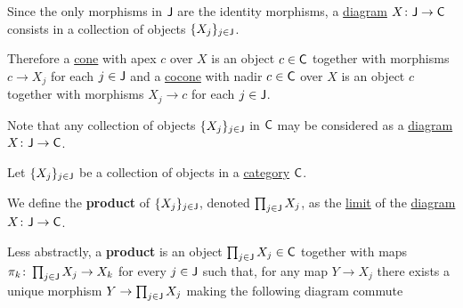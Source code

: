 \documentclass[../../main]{subfiles}
\begin{document}
Since the only morphisms in \(\mathsf{J}\) are the identity morphisms, a \hyperref[def:diagram]{diagram} \(X\colon \mathsf{J} \to \mathsf{C}\) consists in a collection of objects \(\{X_{j}\}_{j \in \mathsf{J}}\).

Therefore a \hyperref[def:cone]{cone} with apex \(c\) over \(X\) is an object \(c \in \mathsf{C}\) together with morphisms \(c \to X_{j}\) for each \(j \in \mathsf{J}\) and a \hyperref[def:cocone]{cocone} with nadir \(c \in \mathsf{C}\) over \(X\) is an object \(c\) together with morphisms \(X_{j} \to c\) for each \(j  \in \mathsf{J}\).

Note that any collection of objects \(\{X_{j}\}_{j \in \mathsf{J}}\) in \(\mathsf{C}\) may be considered as a \hyperref[def:diagram]{diagram} \(X\colon \mathsf{J} \to \mathsf{C}\).

\begin{definition}[Product]\label{def:categorical-product}
  Let \(\{X_{j}\}_{j \in \mathsf{J}}\) be a collection of objects in a \hyperref[def:category]{category} \(\mathsf{C}\).

  We define the \textbf{product} of \(\{X_{j}\}_{j \in \mathsf{J}}\), denoted \(\prod_{j \in \mathsf{J}} X_{j}\), as the \hyperref[def:categorical-limit]{limit} of the \hyperref[def:diagram]{diagram} \(X\colon \mathsf{J} \to \mathsf{C}\).

  Less abstractly, a \textbf{product} is an object \(\prod_{j \in \mathsf{J}} X_{j} \in \mathsf{C}\) together with maps \(\pi_{k}\colon \prod_{j \in \mathsf{J}} X_{j} \to X_{k}\) for every \(j \in \mathsf{J}\) such that, for any map \(Y \to X_{j}\) there exists a unique morphism \(Y \to \prod_{j \in \mathsf{J}} X_{j}\) making the following diagram commute
  \begin{center}
  \end{center}
\end{definition}
\end{document}
